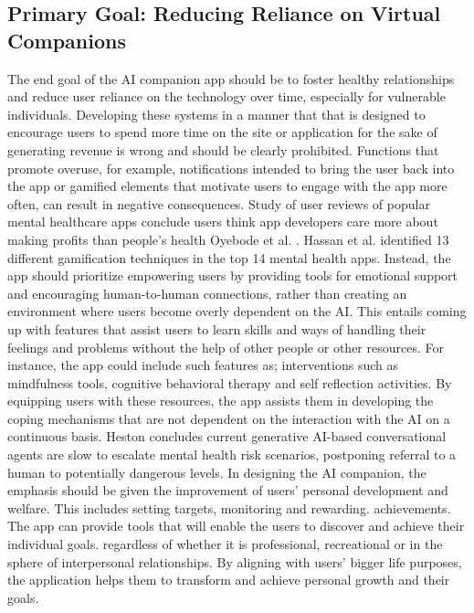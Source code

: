 \subsection{Primary Goal: Reducing Reliance on Virtual Companions}
The end goal of the AI companion app should be to foster healthy relationships and reduce user reliance on the technology over time, especially for vulnerable individuals.  Developing these systems in a manner that that is designed to encourage users to spend more time on the site or application for the sake of generating revenue is wrong and should be clearly prohibited. Functions that promote overuse, for example, notifications intended to bring the user back into the app or gamified elements that motivate users to engage with the app more often, can result in negative consequences. Study of user reviews of popular mental healthcare apps conclude users think app developers care more about making profits than people's health Oyebode et al. \cite{oyebode2020using}. Hassan et al. \cite{auf2021gamification} identified 13 different gamification techniques in the top 14 mental health apps. Instead, the app should prioritize empowering users by providing tools for emotional support and encouraging human-to-human connections, rather than creating an environment where users become overly dependent on the AI. This entails coming up with features that assist users to learn skills and ways of handling their feelings and problems without the help of other people or other resources. For instance, the app could include such features as; interventions such as mindfulness tools, cognitive behavioral therapy and self reflection activities. By equipping users with these resources, the app assists them in developing the coping mechanisms that are not dependent on the interaction with the AI on a continuous basis. Heston \cite{heston2023safety} concludes current generative AI-based conversational agents are slow to escalate mental health risk scenarios, postponing referral to a human to potentially dangerous levels. In designing the AI companion, the emphasis should be given the improvement of users' personal development and welfare. This includes setting targets, monitoring and rewarding. achievements. The app can provide tools that will enable the users to discover and achieve their individual goals. regardless of whether it is professional, recreational or in the sphere of interpersonal relationships. By aligning with users' bigger life purposes, the application helps them to transform and achieve personal growth and their goals.